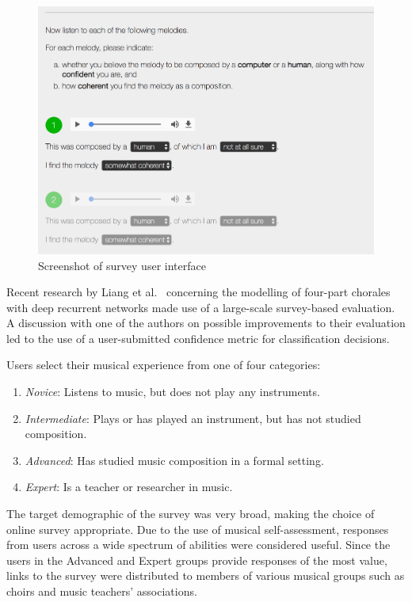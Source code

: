 \documentclass[12pt,a4paper,twoside,openright]{report}
\begin{document}
\begin{figure}[H]
\centering
\includegraphics[width=350pt]{figs/survey_screenshot.png}
\caption{Screenshot of survey user interface}
\label{fig:survey-ui}
\end{figure}

Recent research by Liang et al.\ \cite{liangbachbot} concerning the modelling of
four-part chorales with deep recurrent networks made use of a large-scale
survey-based evaluation. A discussion with one of the authors on possible
improvements to their evaluation led to the use of a user-submitted confidence
metric for classification decisions.

Users select their musical experience from one of four categories:
\begin{enumerate}[label=\arabic*., itemsep=0mm]
  \item \emph{Novice}: Listens to music, but does not play any instruments.
  \item \emph{Intermediate}: Plays or has played an instrument, but has not
    studied composition.
  \item \emph{Advanced}: Has studied music composition in a formal setting.
  \item \emph{Expert}: Is a teacher or researcher in music.
\end{enumerate}
\vspace{2mm}

The target demographic of the survey was very broad, making the choice of online
survey appropriate. Due to the use of musical self-assessment, responses from
users across a wide spectrum of abilities were considered useful. Since the
users in the Advanced and Expert groups provide responses of the most value,
links to the survey were distributed to members of various musical groups such
as choirs and music teachers' associations. 
\end{document}
